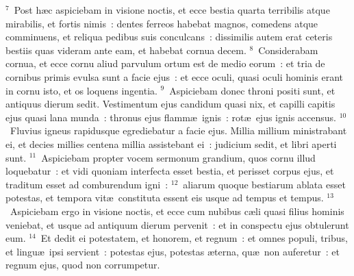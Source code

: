${}^{7}$~Post h\ae c aspiciebam in visione noctis, et ecce bestia quarta terribilis atque mirabilis, et fortis nimis~: dentes ferreos habebat magnos, comedens atque comminuens, et reliqua pedibus suis conculcans~: dissimilis autem erat ceteris bestiis quas videram ante eam, et habebat cornua decem.
${}^{8}$~Considerabam cornua, et ecce cornu aliud parvulum ortum est de medio eorum~: et tria de cornibus primis evulsa sunt a facie ejus~: et ecce oculi, quasi oculi hominis erant in cornu isto, et os loquens ingentia.
${}^{9}$~Aspiciebam donec throni positi sunt, et antiquus dierum sedit. Vestimentum ejus candidum quasi nix, et capilli capitis ejus quasi lana munda~: thronus ejus flamm\ae\ ignis~: rot\ae\ ejus ignis accensus.
${}^{10}$~Fluvius igneus rapidusque egrediebatur a facie ejus. Millia millium ministrabant ei, et decies millies centena millia assistebant ei~: judicium sedit, et libri aperti sunt.
${}^{11}$~Aspiciebam propter vocem sermonum grandium, quos cornu illud loquebatur~: et vidi quoniam interfecta esset bestia, et perisset corpus ejus, et traditum esset ad comburendum igni~:
${}^{12}$~aliarum quoque bestiarum ablata esset potestas, et tempora vit\ae\ constituta essent eis usque ad tempus et tempus.
${}^{13}$~Aspiciebam ergo in visione noctis, et ecce cum nubibus c\ae li quasi filius hominis veniebat, et usque ad antiquum dierum pervenit~: et in conspectu ejus obtulerunt eum.
${}^{14}$~Et dedit ei potestatem, et honorem, et regnum~: et omnes populi, tribus, et lingu\ae\ ipsi servient~: potestas ejus, potestas \ae terna, qu\ae\ non auferetur~: et regnum ejus, quod non corrumpetur.


